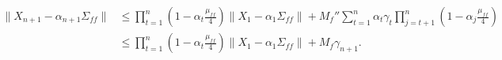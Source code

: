 \begin{align*}
    \lVert X_{n+1} - \alpha_{n+1} \Sigma_{ff} \rVert 
    & \leq 
    \prod_{t=1}^n \left(1 - \alpha_t \frac{\mu_{ff}}{4}\right) \lVert X_1 - \alpha_1 \Sigma_{ff}\rVert 
    + M_f'' \sum_{t=1}^n \alpha_t \gamma_t \prod_{j=t+1}^n \left(1 - \alpha_j \frac{\mu_{ff}}{4}\right) 
    \\
    & \leq 
    \prod_{t=1}^n \left(1 - \alpha_t \frac{\mu_{ff}}{4}\right) \lVert X_1 - \alpha_1 \Sigma_{ff} \rVert + M_f \gamma_{n+1}
    .
\end{align*}


